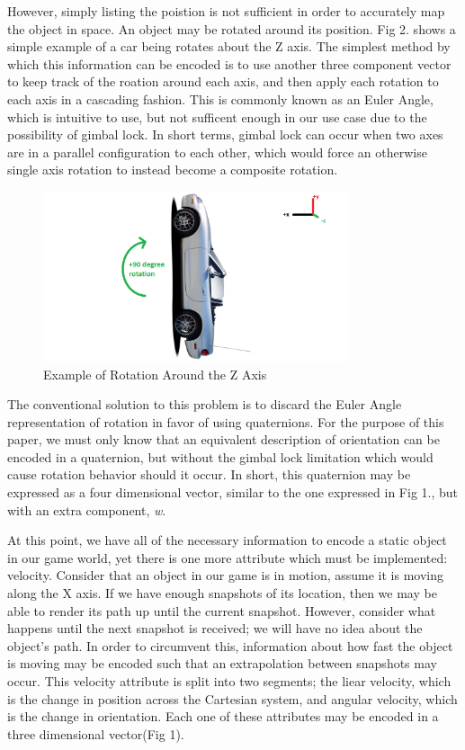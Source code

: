 \documentclass[conference]{IEEEtran}
\begin{document}
However, simply listing the poistion is not sufficient in order to accurately map the object in space. An object may be rotated
around its position. Fig 2. shows a simple example of a car being rotates about the Z axis. The simplest method by which this information can be encoded
is to use another three component vector to keep track of the roation around each axis, and then apply each rotation to each axis in a cascading fashion.
This is commonly known as an Euler Angle, which is intuitive to use, but not sufficent enough in our use case due to the possibility of gimbal lock.
In short terms, gimbal lock can occur when two axes are in a parallel configuration to each other, which would force an otherwise single axis rotation to instead
become a composite rotation.


\begin{figure}[htbp]
\centerline{\includegraphics [width = 9cm, height = 5cm] {fig2.png}}
\caption{Example of Rotation Around the Z Axis}
\end{figure}

The conventional solution to this problem is to discard the Euler Angle representation of rotation in favor of using quaternions.
For the purpose of this paper, we must only know that an equivalent description of orientation can be encoded in a quaternion,
but without the gimbal lock limitation which would cause rotation behavior should it occur. In short, this quaternion may be expressed as a four dimensional
vector, similar to the one expressed in Fig 1., but with an extra component, \textit{w}.

At this point, we have all of the necessary information to encode a static object in our game world, yet there is one more attribute which
must be implemented: velocity. Consider that an object in our game is in motion, assume it is moving along the X axis. If we have enough snapshots of its location,
then we may be able to render its path up until the current snapshot. However, consider what happens until the next snapshot is received; we will have no idea about the object's path.
In order to circumvent this, information about how fast the object is moving may be encoded such that an extrapolation between snapshots may occur. This velocity attribute
is split into two segments; the liear velocity, which is the change in position across the Cartesian system, and angular velocity, which is the change in orientation.
Each one of these attributes may be encoded in a three dimensional vector(Fig 1).
\end{document}

